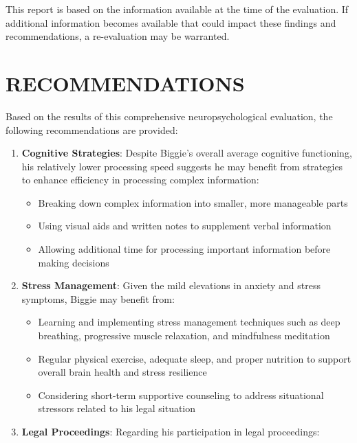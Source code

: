 \documentclass[
  letterpaper,
  DIV=11,
  numbers=noendperiod]{scrartcl}
\providecommand{\tightlist}{%
  \setlength{\itemsep}{0pt}\setlength{\parskip}{0pt}}
\begin{document}
This report is based on the information available at the time of the
evaluation. If additional information becomes available that could
impact these findings and recommendations, a re-evaluation may be
warranted.

\section{RECOMMENDATIONS}\label{recommendations-1}

Based on the results of this comprehensive neuropsychological
evaluation, the following recommendations are provided:

\begin{enumerate}
\def\labelenumi{\arabic{enumi}.}
\tightlist
\item
  \textbf{Cognitive Strategies}: Despite Biggie's overall average
  cognitive functioning, his relatively lower processing speed suggests
  he may benefit from strategies to enhance efficiency in processing
  complex information:

  \begin{itemize}
  \tightlist
  \item
    Breaking down complex information into smaller, more manageable
    parts
  \item
    Using visual aids and written notes to supplement verbal information
  \item
    Allowing additional time for processing important information before
    making decisions
  \end{itemize}
\item
  \textbf{Stress Management}: Given the mild elevations in anxiety and
  stress symptoms, Biggie may benefit from:

  \begin{itemize}
  \tightlist
  \item
    Learning and implementing stress management techniques such as deep
    breathing, progressive muscle relaxation, and mindfulness meditation
  \item
    Regular physical exercise, adequate sleep, and proper nutrition to
    support overall brain health and stress resilience
  \item
    Considering short-term supportive counseling to address situational
    stressors related to his legal situation
  \end{itemize}
\item
  \textbf{Legal Proceedings}: Regarding his participation in legal
  proceedings:


\end{enumerate}
\end{document}
